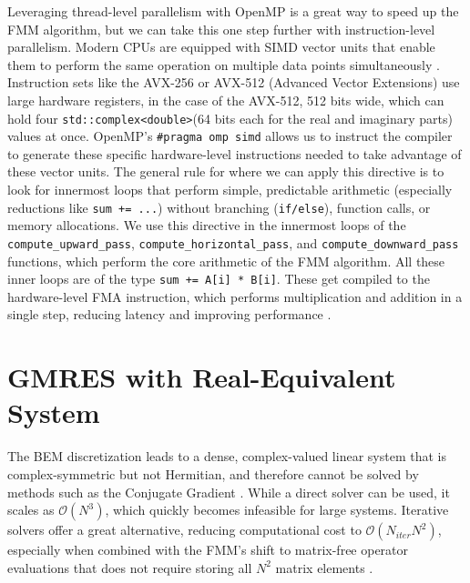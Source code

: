 Leveraging thread-level parallelism with OpenMP is a great way to speed up the \ac{FMM} algorithm, but we can take this one step further with instruction-level parallelism. Modern \ac{CPU}s are equipped with \ac{SIMD} vector units that enable them to perform the same operation on multiple data points simultaneously \cite{xievectorizationprogrammingbased2023}. Instruction sets like the AVX-256 or AVX-512 (Advanced Vector Extensions) use large hardware registers, in the case of the AVX-512, 512 bits wide, which can hold four \texttt{std::complex\textless double\textgreater}(64 bits each for the real and imaginary parts) values at once. 
OpenMP's \texttt{\#pragma omp simd} allows us to instruct the compiler to generate these specific hardware-level instructions needed to take advantage of these vector units. The general rule for where we can apply this directive is to look for innermost loops that perform simple, predictable arithmetic (especially reductions like \texttt{sum += ...}) without branching (\texttt{if/else}), function calls, or memory allocations. We use this directive in the innermost loops of the \texttt{compute\_upward\_pass}, \texttt{compute\_horizontal\_pass}, and \texttt{compute\_downward\_pass} functions, which perform the core arithmetic of the FMM algorithm. All these inner loops are of the type \texttt{sum += A[i] * B[i]}. These get compiled to the hardware-level \ac{FMA} instruction, which performs multiplication and addition in a single step, reducing latency and improving performance \cite{fogvclvectorclass}.



\section{GMRES with Real-Equivalent System} \label{sec:gmres-real-equivalent-system}

The \ac{BEM} discretization leads to a dense, complex-valued linear system that is complex-symmetric but not Hermitian, and therefore cannot be solved by methods such as the Conjugate Gradient \cite{shirroncomparisonapproximateboundary}. While a direct solver can be used, it scales as $\mathcal{O}(N^3)$, which quickly becomes infeasible for large systems. Iterative solvers offer a great alternative, reducing computational cost to $\mathcal{O}(N_{iter}N^2)$, especially when combined with the \ac{FMM}'s shift to matrix-free operator evaluations that does not require storing all $N^2$ matrix elements \cite{gumerovbroadbandfastmultipole2009,ibeidmatrixfreepreconditionerhelmholtz2016}.

